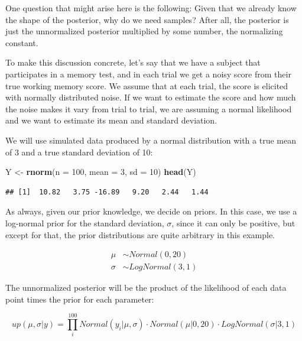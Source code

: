 \documentclass[12pt,]{krantz}
\newenvironment{Shaded}{\begin{snugshade}}{\end{snugshade}}
\newcommand{\KeywordTok}[1]{\textcolor[rgb]{0.13,0.29,0.53}{\textbf{#1}}}
\newcommand{\DataTypeTok}[1]{\textcolor[rgb]{0.13,0.29,0.53}{#1}}
\newcommand{\DecValTok}[1]{\textcolor[rgb]{0.00,0.00,0.81}{#1}}
\newcommand{\StringTok}[1]{\textcolor[rgb]{0.31,0.60,0.02}{#1}}
\newcommand{\NormalTok}[1]{#1}
\theoremstyle{definition}
\theoremstyle{definition}
\theoremstyle{definition}
\theoremstyle{remark}
\begin{document}
One question that might arise here is the following: Given that we
already know the shape of the posterior, why do we need samples? After
all, the posterior is just the unnormalized posterior multiplied by some
number, the normalizing constant.

To make this discussion concrete, let's say that we have a subject that
participates in a memory test, and in each trial we get a noisy score
from their true working memory score. We assume that at each trial, the
score is elicited with normally distributed noise. If we want to
estimate the score and how much the noise makes it vary from trial to
trial, we are assuming a normal likelihood and we want to estimate its
mean and standard deviation.

We will use simulated data produced by a normal distribution with a true
mean of 3 and a true standard deviation of 10:

\begin{Shaded}
\begin{Highlighting}[]
\NormalTok{Y <-}\StringTok{ }\KeywordTok{rnorm}\NormalTok{(}\DataTypeTok{n =} \DecValTok{100}\NormalTok{, }\DataTypeTok{mean =} \DecValTok{3}\NormalTok{, }\DataTypeTok{sd =} \DecValTok{10}\NormalTok{)}
\KeywordTok{head}\NormalTok{(Y)}
\end{Highlighting}
\end{Shaded}

\begin{verbatim}
## [1]  10.82   3.75 -16.89   9.20   2.44   1.44
\end{verbatim}

As always, given our prior knowledge, we decide on priors. In this case,
we use a log-normal prior for the standard deviation, \(\sigma\), since
it can only be positive, but except for that, the prior distributions
are quite arbitrary in this example.

\begin{equation}
\begin{aligned}
\mu &\sim Normal(0, 20)\\
\sigma &\sim LogNormal(3, 1)
\end{aligned}
\label{eq:priorsdem}
\end{equation}

The unnormalized posterior will be the product of the likelihood of each
data point times the prior for each parameter:

\begin{equation}
up(\mu, \sigma |y) = \prod_i^{100} Normal(y_i|\mu, \sigma) \cdot Normal(\mu | 0, 20) \cdot LogNormal(\sigma | 3, 1)
\label{eq:up}
\end{equation}
\end{document}
